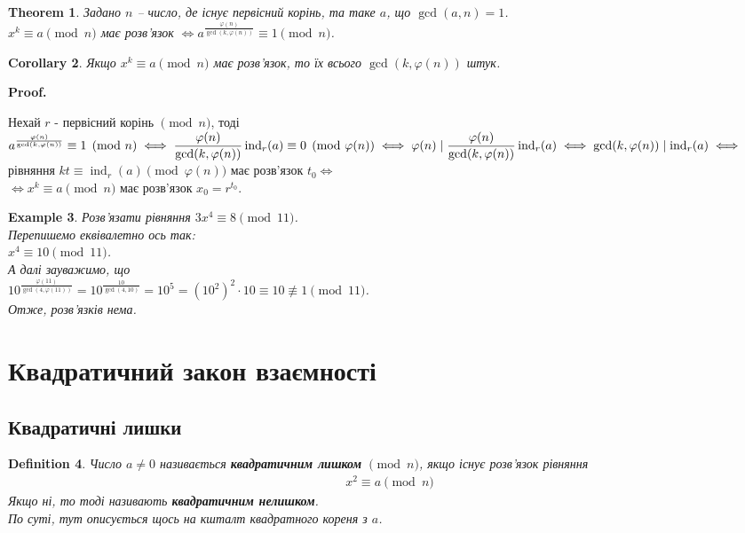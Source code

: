 \documentclass[a4paper, 14pt]{extarticle}
\makeatletter
\theoremstyle{theoremdd}
\newtheorem{theorem}{Theorem}[subsection]
\theoremstyle{theoremdd}
\newtheorem{definition}[theorem]{Definition}
\theoremstyle{theoremdd}
\theoremstyle{theoremdd}
\newtheorem{example}[theorem]{Example}
\theoremstyle{theoremdd}
\theoremstyle{theoremdd}
\theoremstyle{theoremdd}
\theoremstyle{theoremdd}
\newtheorem{corollary}[theorem]{Corollary}
\def\qed{$\blacksquare$}
\renewenvironment{proof}[1][Proof.\\]{\par
\pushQED{\hfill \qed}%
\normalfont \topsep6\p@\@plus6\p@\relax
\trivlist
\item\relax
{\bfseries
#1\@addpunct{.}}\hspace\labelsep\ignorespaces
}{%
\popQED\endtrivlist\@endpefalse
}
\DeclareMathOperator{\ind}{ind}
\makeatother
\begin{document}
\begin{theorem}
Задано $n$ -- число, де існує первісний корінь, та таке $a$, що $\gcd(a,n) = 1$.\\
$x^k \equiv a \pmod n$ має розв'язок $\iff a^{\frac{\varphi(n)}{\gcd(k,\varphi(n))}} \equiv 1 \pmod n$.
\end{theorem}

\begin{corollary}
Якщо $x^k \equiv a \pmod n$ має розв'язок, то їх всього $\gcd(k,\varphi(n))$ штук.
\end{corollary}

\begin{proof}
Нехай $r$ - первісний корінь $\pmod n$, тоді\\
$a^{\frac{\varphi(n)}{\gcd(k,\varphi(n))}} \equiv 1 \pmod n \iff \dfrac{\varphi(n)}{\gcd(k,\varphi(n))} \ind_r (a) \equiv 0 \pmod {\varphi(n)} \\
\iff \varphi(n) \mid \dfrac{\varphi(n)}{\gcd(k,\varphi(n))} \ind_r(a) \iff \gcd(k,\varphi(n)) \mid \ind_r(a) \iff$\\
рівняння $kt \equiv \ind_r (a) \pmod {\varphi(n)}$ має розв'язок $t_0 \iff$\\
$\iff x^k \equiv a \pmod n$ має розв'язок $x_0 = r^{t_0}$.
\end{proof}

\begin{example}
Розв'язати рівняння $3x^4 \equiv 8 \pmod {11}$.\\
Перепишемо еквівалетно ось так:\\
$x^4 \equiv 10 \pmod {11}$.\\
А далі зауважимо, що \\
$10^{\frac{\varphi(11)}{\gcd(4,\varphi(11))}} = 10^{\frac{10}{\gcd(4,10)}} = 10^5 = (10^2)^2 \cdot 10 \equiv 10 \not\equiv 1 \pmod {11}$.\\
Отже, розв'язків нема.
\end{example}
\newpage

\section{Квадратичний закон взаємності}
\subsection{Квадратичні лишки}
\begin{definition}
Число $a \neq 0$ називається \textbf{квадратичним лишком} $\pmod n$, якщо існує розв'язок рівняння
\begin{align*}
x^2 \equiv a \pmod n
\end{align*}
Якщо ні, то тоді називають \textbf{квадратичним нелишком}.\\
По суті, тут описується щось на кшталт квадратного кореня з $a$.
\end{definition}
\end{document}
